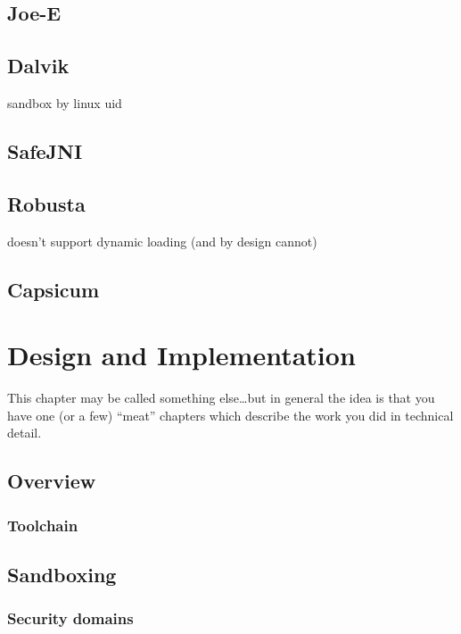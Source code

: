 \documentclass[a4paper,12pt,twoside,openright]{report}
\begin{document}
\section{Joe-E}

\section{Dalvik}

sandbox by linux uid

\section{SafeJNI}

\section{Robusta}

doesn't support dynamic loading (and by design cannot)

\section{Capsicum}

\chapter{Design and Implementation} 

This chapter may be called something else\ldots but in general 
the idea is that you have one (or a few) ``meat'' chapters which
describe the work you did in technical detail. 

\section{Overview}

\subsection{Toolchain}

\section{Sandboxing}

\subsection{Security domains}
\end{document}
